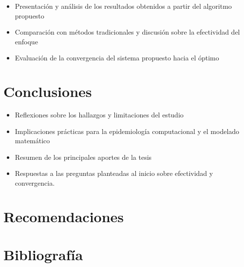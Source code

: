 \documentclass{article}
\begin{document}
    \begin{itemize}
        \item  Presentación y análisis de los resultados obtenidos a partir del algoritmo propuesto
        \item  Comparación con métodos tradicionales y discusión sobre la efectividad del enfoque
        \item  Evaluación de la convergencia del sistema propuesto hacia el óptimo
    \end{itemize}

\newpage

    \section*{ \Huge Conclusiones }
    \label{sec:19}
    \begin{itemize}
        \item  Reflexiones sobre los hallazgos y limitaciones del estudio
        \item  Implicaciones prácticas para la epidemiología computacional y el modelado matemático
       \item  Resumen de los principales aportes de la tesis
        \item  Respuestas a las preguntas planteadas al inicio sobre efectividad y convergencia.
    \end{itemize}

\newpage

\section*{ \Huge Recomendaciones }
\label{sec:20}

\newpage

\section*{ \Huge Bibliografía }
\label{sec:21}
\end{document}
